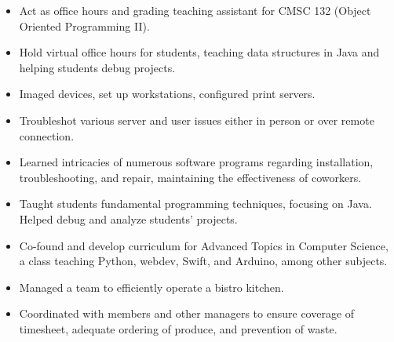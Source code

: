 \documentclass[11pt]{article}
\begin{document}
\hsep

\vspace{2mm}
{\fontsize{10}{12}\robotocondlight
    \begin{itemize}[noitemsep,nolistsep]
        \item Act as office hours and grading teaching assistant for CMSC 132 (Object Oriented Programming II).
        \item Hold virtual office hours for students, teaching data structures in Java and helping students debug projects.
    \end{itemize}
    \vspace{3mm}

    \begin{itemize}[noitemsep,nolistsep]
        \item Imaged devices, set up workstations, configured print servers. 
        \item Troubleshot various server and user issues either in person or over remote connection.
        \item Learned intricacies of numerous software programs regarding installation, troubleshooting, and repair, maintaining the effectiveness of coworkers. 
    \end{itemize}
    \vspace{3mm}
    \begin{itemize}[noitemsep,nolistsep]
        \item Taught students fundamental programming techniques, focusing on Java. Helped debug and analyze students’ projects. 
        \item Co-found and develop curriculum for Advanced Topics in Computer Science, a class teaching Python, webdev, Swift, and Arduino, among other subjects. 
    \end{itemize}
    \vspace{3mm}
    \begin{itemize}[noitemsep,nolistsep]
        \item Managed a team to efficiently operate a bistro kitchen. 
        \item Coordinated with members and other managers to ensure coverage of timesheet, adequate ordering of produce, and prevention of waste.

\end{itemize}}
\end{document}
